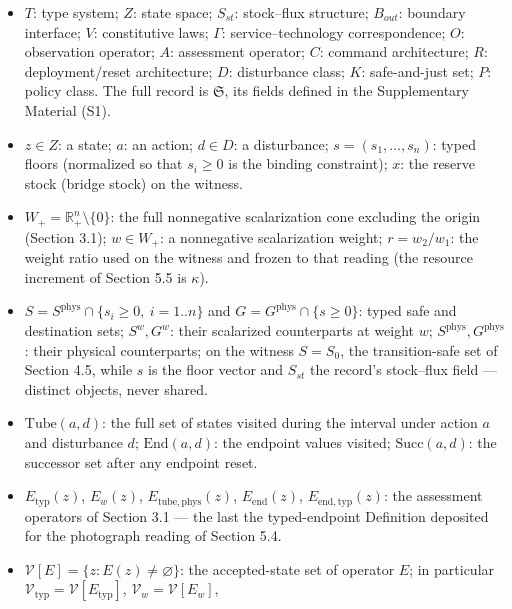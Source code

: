 \documentclass[11pt]{article}
\providecommand{\tightlist}{\setlength{\itemsep}{0pt}\setlength{\parskip}{0pt}}
\begin{document}
\begin{itemize}
\tightlist
\item
  \(T\): type system; \(Z\): state space; \(S_{st}\): stock--flux
  structure; \(B_{out}\): boundary interface; \(V\): constitutive laws;
  \(\Gamma\): service--technology correspondence; \(O\): observation
  operator; \(A\): assessment operator; \(C\): command architecture;
  \(R\): deployment/reset architecture; \(D\): disturbance class; \(K\):
  safe-and-just set; \(P\): policy class. The full record is
  \(\mathfrak{S}\), its fields defined in the Supplementary Material
  (S1).
\item
  \(z \in Z\): a state; \(a\): an action; \(d \in D\): a disturbance;
  \(s = (s_1, \ldots, s_n)\): typed floors (normalized so that
  \(s_i \ge 0\) is the binding constraint); \(x\): the reserve stock
  (bridge stock) on the witness.
\item
  \(W_+ = \mathbb{R}^n_+ \setminus \{0\}\): the full nonnegative
  scalarization cone excluding the origin (Section 3.1); \(w \in W_+\):
  a nonnegative scalarization weight; \(r = w_2 / w_1\): the weight
  ratio used on the witness and frozen to that reading (the resource
  increment of Section 5.5 is \(\kappa\)).
\item
  \(S = S^{\mathrm{phys}} \cap \{ s_i \ge 0,\ i = 1..n \}\) and
  \(G = G^{\mathrm{phys}} \cap \{ s \ge 0 \}\): typed safe and
  destination sets; \(S^w, G^w\): their scalarized counterparts at
  weight \(w\); \(S^{\mathrm{phys}}, G^{\mathrm{phys}}\): their physical
  counterparts; on the witness \(S = S_0\), the transition-safe set of
  Section 4.5, while \(s\) is the floor vector and \(S_{st}\) the
  record's stock--flux field --- distinct objects, never shared.
\item
  \(\mathrm{Tube}(a,d)\): the full set of states visited during the
  interval under action \(a\) and disturbance \(d\);
  \(\mathrm{End}(a,d)\): the endpoint values visited;
  \(\mathrm{Succ}(a,d)\): the successor set after any endpoint reset.
\item
  \(E_{\mathrm{typ}}(z)\), \(E_w(z)\), \(E_{\mathrm{tube,phys}}(z)\),
  \(E_{\mathrm{end}}(z)\), \(E_{\mathrm{end,typ}}(z)\): the assessment
  operators of Section 3.1 --- the last the typed-endpoint Definition
  deposited for the photograph reading of Section 5.4.
\item
  \(\mathcal{V}[E] = \{ z : E(z) \neq \varnothing \}\): the
  accepted-state set of operator \(E\); in particular
  \(\mathcal{V}_{\mathrm{typ}} = \mathcal{V}[E_{\mathrm{typ}}]\),
  \(\mathcal{V}_w = \mathcal{V}[E_w]\),

\end{itemize}
\end{document}
